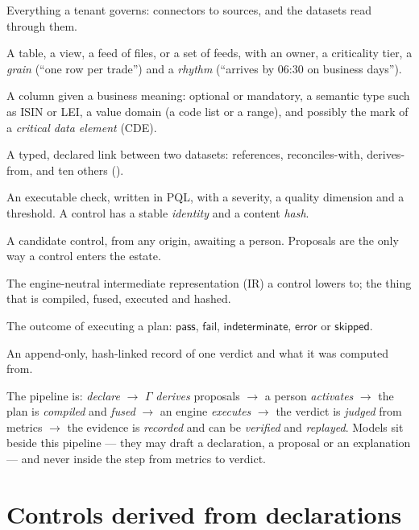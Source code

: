\documentclass[11pt,a4paper]{article}
\renewcommand{\_}{\oldunderscore\allowbreak}
\theoremstyle{plain}
\theoremstyle{definition}
\theoremstyle{remark}
\newcommand{\PASS}{\textsf{pass}}
\newcommand{\FAIL}{\textsf{fail}}
\newcommand{\IND}{\textsf{indeterminate}}
\newcommand{\ERR}{\textsf{error}}
\newcommand{\SKIP}{\textsf{skipped}}
\newcommand{\Gam}{\Gamma}
\begin{document}
\begin{description}[leftmargin=1.5em,style=nextline]
  \item[Estate] Everything a tenant governs: connectors to sources, and the datasets read through them.
  \item[Dataset] A table, a view, a feed of files, or a set of feeds, with an owner, a criticality tier,
        a \emph{grain} (``one row per trade'') and a \emph{rhythm} (``arrives by 06:30 on business days'').
  \item[Attribute] A column given a business meaning: optional or mandatory, a semantic type such as ISIN
        or LEI, a value domain (a code list or a range), and possibly the mark of a \emph{critical data
        element} (CDE).
  \item[Relationship] A typed, declared link between two datasets: \textsf{references},
        \textsf{reconciles-with}, \textsf{derives-from}, and ten others ().
  \item[Control] An executable check, written in PQL, with a severity, a quality dimension and a
        threshold. A control has a stable \emph{identity} and a content \emph{hash}.
  \item[Proposal] A candidate control, from any origin, awaiting a person. Proposals are the only way a
        control enters the estate.
  \item[Plan] The engine-neutral intermediate representation (IR) a control lowers to; the thing that is
        compiled, fused, executed and hashed.
  \item[Verdict] The outcome of executing a plan: $\PASS$, $\FAIL$, $\IND$, $\ERR$ or $\SKIP$.
  \item[Evidence record] An append-only, hash-linked record of one verdict and what it was computed from.
\end{description}

The pipeline is: \emph{declare} $\to$ $\Gam$ \emph{derives} proposals $\to$ a person \emph{activates}
$\to$ the plan is \emph{compiled} and \emph{fused} $\to$ an engine \emph{executes} $\to$ the verdict is
\emph{judged} from metrics $\to$ the evidence is \emph{recorded} and can be \emph{verified} and
\emph{replayed}. Models sit beside this pipeline --- they may draft a declaration, a proposal or an
explanation --- and never inside the step from metrics to verdict.

\section{Controls derived from declarations}\label{sec:gamma}
\end{document}
